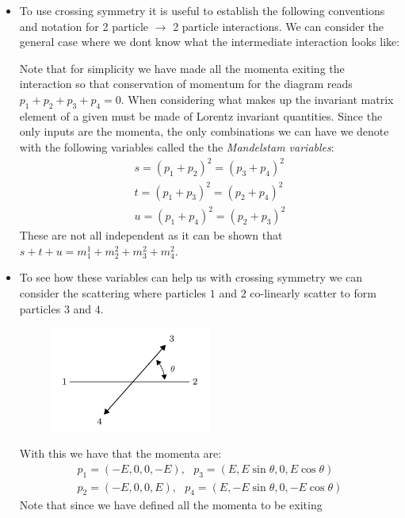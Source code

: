 \documentclass[11pt]{article}
\numberwithin{equation}{section}
\begin{document}
\begin{itemize}
  \item To use crossing symmetry it is useful to establish the following conventions and notation for 2 particle $\rightarrow$ 2 particle interactions. We can consider the general case where we dont know what the intermediate interaction looks like:
\begin{figure}[H]
\centering
{}
\end{figure}
Note that for simplicity we have made all the momenta exiting the interaction so that conservation of momentum for the diagram reads $p_1+p_2+p_3+p_4=0$. When considering what makes up the invariant matrix element of a given must be made of Lorentz invariant quantities. Since the only inputs are the momenta, the only combinations we can have we denote with the following variables called the the \emph{Mandelstam variables}:
\begin{align*}
    s =(p_1+p_2)^2 = (p_3+p_4)^2 \\
    t = (p_1+p_3)^2 = (p_2+p_4)^2 \\
    u = (p_1+p_4)^2 = (p_2+p_3)^2 
\end{align*}
These are not all independent as it can be shown that $s+t+u = m_1^1+m_2^2+m_3^2+m_4^2$. 

\item To see how these variables can help us with crossing symmetry we can consider the scattering where particles $1$ and $2$ co-linearly scatter to form particles $3$ and $4$. 
\begin{figure}[H]
\centering
\includegraphics[width=0.5\textwidth]{1_2_scatter}
\end{figure}
With this we have that the momenta are:
\begin{align*}
    p_1 = (-E,0,0,-E), ~~~p_3 = (E,E\sin \theta,0,E\cos \theta) \\
    p_2 = (-E,0,0,E), ~~~p_4 = (E,-E\sin \theta,0,-E\cos \theta)   
\end{align*}
Note that since we have defined all the momenta to be exiting 

\end{itemize}

\end{document}
